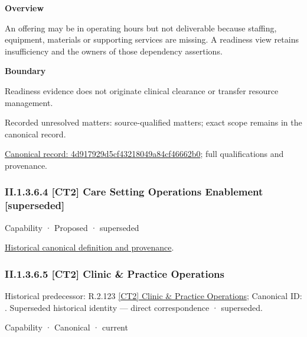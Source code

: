 \textbf{Overview}



An offering may be in operating hours but not deliverable because staffing, equipment, materials or supporting services are missing. A readiness view retains insufficiency and the owners of those dependency assertions.



\textbf{Boundary}



Readiness evidence does not originate clinical clearance or transfer resource management.


{\small Recorded unresolved matters: source-qualified matters; exact scope remains in the canonical record.}\par
{\footnotesize \href{../../../../../../../continuum/strategy/capability/feature/4d917929d5cf43218049a84cf46662b0.md}{Canonical record: 4d917929d5cf43218049a84cf46662b0}; full qualifications and provenance.}\par
\subsubsection*{II.1.3.6.4 [CT2] Care Setting Operations Enablement [superseded]}
\label{navigation:II.1.3.6.4}

\label{element:a03741e6e98642bea44680d23fdcb434}
{\small Capability · Proposed · superseded}\par
\href{../../../../../../../continuum/strategy/capability/a03741e6e98642bea44680d23fdcb434.md}{Historical canonical definition and provenance}.\par
\subsubsection*{II.1.3.6.5 [CT2] Clinic \& Practice Operations}
\label{navigation:II.1.3.6.5}

{\small Historical predecessor: R.2.123 \hyperref[element:0856d2daf2ba4b92b5390b38b98efb54]{[CT2] Clinic \& Practice Operations}; Canonical ID: \texttt{}. Superseded historical identity — direct correspondence · superseded.}\par
\label{element:3dffe63e03124efab255204ee4e9a5d9}
{\small Capability · Canonical · current}\par

